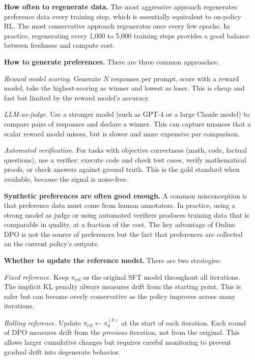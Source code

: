 \begin{chapterenv}
\textbf{How often to regenerate data.} The most aggressive approach regenerates preference data every training step, which is essentially equivalent to on-policy RL. The most conservative approach regenerates once every few epochs. In practice, regenerating every 1,000 to 5,000 training steps provides a good balance between freshness and compute cost.

\textbf{How to generate preferences.} There are three common approaches:

\textit{Reward model scoring.} Generate $N$ responses per prompt, score with a reward model, take the highest-scoring as winner and lowest as loser. This is cheap and fast but limited by the reward model's accuracy.

\textit{LLM-as-judge.} Use a stronger model (such as GPT-4 or a large Claude model) to compare pairs of responses and declare a winner. This can capture nuances that a scalar reward model misses, but is slower and more expensive per comparison.

\textit{Automated verification.} For tasks with objective correctness (math, code, factual questions), use a verifier: execute code and check test cases, verify mathematical proofs, or check answers against ground truth. This is the gold standard when available, because the signal is noise-free.

\begin{tipbox}
\textbf{Synthetic preferences are often good enough.} A common misconception is that preference data must come from human annotators. In practice, using a strong model as judge or using automated verifiers produces training data that is comparable in quality, at a fraction of the cost. The key advantage of Online DPO is not the source of preferences but the fact that preferences are collected on the current policy's outputs.
\end{tipbox}

\textbf{Whether to update the reference model.} There are two strategies:

\textit{Fixed reference.} Keep $\pi_{\text{ref}}$ as the original SFT model throughout all iterations. The implicit KL penalty always measures drift from the starting point. This is safer but can become overly conservative as the policy improves across many iterations.

\textit{Rolling reference.} Update $\pi_{\text{ref}} \leftarrow \pi_\theta^{(k)}$ at the start of each iteration. Each round of DPO measures drift from the \textit{previous} iteration, not from the original. This allows larger cumulative changes but requires careful monitoring to prevent gradual drift into degenerate behavior.


\end{chapterenv}
